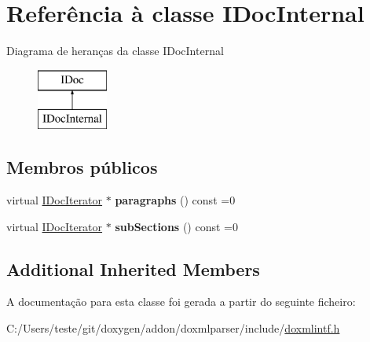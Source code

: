 \hypertarget{class_i_doc_internal}{\section{Referência à classe I\-Doc\-Internal}
\label{class_i_doc_internal}
}
Diagrama de heranças da classe I\-Doc\-Internal\begin{figure}[H]
\begin{center}
\leavevmode
\includegraphics[height=2.000000cm]{class_i_doc_internal}
\end{center}
\end{figure}
\subsection*{Membros públicos}
\begin{DoxyCompactItemize}
\item 
\hypertarget{class_i_doc_internal_ae1fe3e12effaa793bab3244c2cf6482e}{virtual \hyperlink{class_i_doc_iterator}{I\-Doc\-Iterator} $\ast$ {\bfseries paragraphs} () const =0}\label{class_i_doc_internal_ae1fe3e12effaa793bab3244c2cf6482e}

\item 
\hypertarget{class_i_doc_internal_a378ec891d6d588e15b2a3675ac9095b0}{virtual \hyperlink{class_i_doc_iterator}{I\-Doc\-Iterator} $\ast$ {\bfseries sub\-Sections} () const =0}\label{class_i_doc_internal_a378ec891d6d588e15b2a3675ac9095b0}

\end{DoxyCompactItemize}
\subsection*{Additional Inherited Members}


A documentação para esta classe foi gerada a partir do seguinte ficheiro\-:\begin{DoxyCompactItemize}
\item 
C\-:/\-Users/teste/git/doxygen/addon/doxmlparser/include/\hyperlink{include_2doxmlintf_8h}{doxmlintf.\-h}\end{DoxyCompactItemize}
